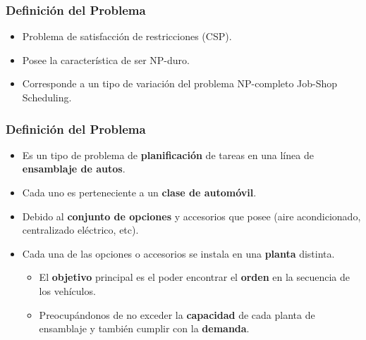 \frame
{
\frametitle{Definición del Problema}
\begin{itemize}
	\item Problema de satisfacción de restricciones (CSP).
 	\item Posee la característica de ser NP-duro.
	\item Corresponde a un tipo de variación del problema NP-completo Job-Shop Scheduling. 
\end{itemize}
}

\frame
{
\frametitle{Definición del Problema}
\begin{itemize}
	\item Es un tipo de problema de {\bf planificación} de tareas en una línea de {\bf ensamblaje de autos}.
 	\item Cada uno es perteneciente a un {\bf clase de automóvil}.
	\item Debido al {\bf conjunto de opciones} y accesorios que posee (aire acondicionado, centralizado eléctrico, etc).
 	\item Cada una de las opciones o accesorios se instala en una {\bf planta} distinta.
	\begin{itemize}
		\item El {\bf objetivo} principal es el poder encontrar el {\bf orden} en la secuencia de los vehículos.
		\item Preocupándonos de no exceder la {\bf capacidad} de cada planta de ensamblaje y también cumplir con la {\bf demanda}.
	\end{itemize}
\end{itemize}
}
